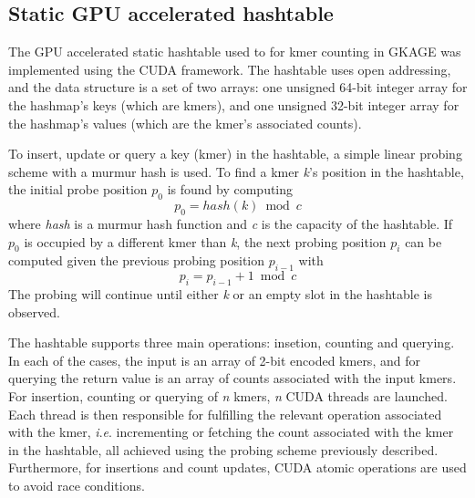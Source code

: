 \subsection*{Static GPU accelerated hashtable}

The GPU accelerated static hashtable used to for kmer counting in GKAGE was implemented using the CUDA framework.
The hashtable uses open addressing, and the data structure is a set of two arrays: one unsigned 64-bit integer array for the hashmap's keys (which are kmers), and one unsigned 32-bit integer array for the hashmap's values (which are the kmer's associated counts).

To insert, update or query a key (kmer) in the hashtable, a simple linear probing scheme with a murmur hash is used.
To find a kmer \textit{k}'s position in the hashtable, the initial probe position \textit{$p_0$} is found by computing
\begin{equation}
  p_0=hash(k) \bmod c
\end{equation}
where \textit{hash} is a murmur hash function and \textit{c} is the capacity of the hashtable.
If \textit{$p_0$} is occupied by a different kmer than \textit{k}, the next probing position \textit{$p_i$} can be computed given the previous probing position \textit{$p_{i-1}$} with
\begin{equation}
  p_i=p_{i-1} + 1 \bmod c
\end{equation}
The probing will continue until either \textit{k} or an empty slot in the hashtable is observed.

The hashtable supports three main operations: insetion, counting and querying.
In each of the cases, the input is an array of 2-bit encoded kmers, and for querying the return value is an array of counts associated with the input kmers.
For insertion, counting or querying of \textit{n} kmers, \textit{n} CUDA threads are launched.
Each thread is then responsible for fulfilling the relevant operation associated with the kmer, \textit{i}.\textit{e}. incrementing or fetching the count associated with the kmer in the hashtable, all achieved using the probing scheme previously described.
Furthermore, for insertions and count updates, CUDA atomic operations are used to avoid race conditions.


